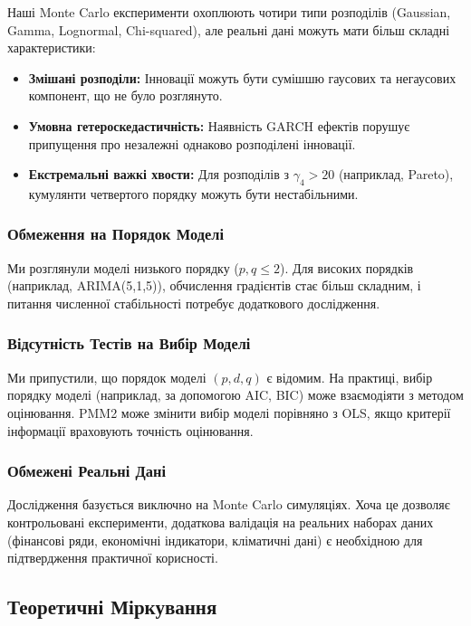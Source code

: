 \documentclass[12pt,a4paper]{article}
\begin{document}
Наші Monte Carlo експерименти охоплюють чотири типи розподілів (Gaussian, Gamma, Lognormal, Chi-squared), але реальні дані можуть мати більш складні характеристики:

\begin{itemize}
    \item \textbf{Змішані розподіли:} Інновації можуть бути сумішшю гаусових та негаусових компонент, що не було розглянуто.
    \item \textbf{Умовна гетероскедастичність:} Наявність GARCH ефектів порушує припущення про незалежні однаково розподілені інновації.
    \item \textbf{Екстремальні важкі хвости:} Для розподілів з $\gamma_4 > 20$ (наприклад, Pareto), кумулянти четвертого порядку можуть бути нестабільними.
\end{itemize}

\subsubsection{Обмеження на Порядок Моделі}

Ми розглянули моделі низького порядку ($p, q \leq 2$). Для високих порядків (наприклад, ARIMA(5,1,5)), обчислення градієнтів стає більш складним, і питання численної стабільності потребує додаткового дослідження.

\subsubsection{Відсутність Тестів на Вибір Моделі}

Ми припустили, що порядок моделі $(p, d, q)$ є відомим. На практиці, вибір порядку моделі (наприклад, за допомогою AIC, BIC) може взаємодіяти з методом оцінювання. PMM2 може змінити вибір моделі порівняно з OLS, якщо критерії інформації враховують точність оцінювання.

\subsubsection{Обмежені Реальні Дані}

Дослідження базується виключно на Monte Carlo симуляціях. Хоча це дозволяє контрольовані експерименти, додаткова валідація на реальних наборах даних (фінансові ряди, економічні індикатори, кліматичні дані) є необхідною для підтвердження практичної корисності.

\subsection{Теоретичні Міркування}
\label{subsec:theoretical_considerations}
\end{document}
